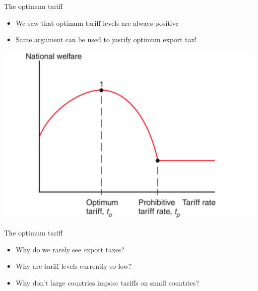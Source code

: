 \documentclass{beamer}
\begin{document}
\begin{frame}{The optimum tariff}
    \begin{itemize}
        \item We saw that optimum tariff levels are always positive
        \item Same argument can be used to justify optimum export tax!
    \end{itemize}
    \includegraphics[scale=0.20]{optimum_tariff.png}
\end{frame}


\begin{frame}{The optimum tariff}
    \begin{itemize}
        \item Why do we rarely see export taxes?
        \item Why are tariff levels currently so low?
        \item Why don't large countries impose tariffs on small countries?
    \end{itemize}
\end{frame}
\end{document}
